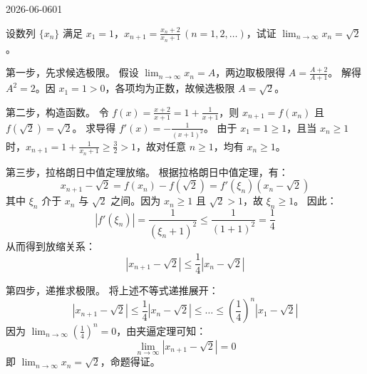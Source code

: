 \begin{mistake}{2026-06-06}{01}

\begin{problemcontent}
设数列 \(\{x_n\}\) 满足 \(x_1 = 1\)，\(x_{n+1} = \frac{x_n + 2}{x_n + 1} \, (n=1,2,\dots)\)，试证 \(\lim_{n \to \infty} x_n = \sqrt{2}\)。
\end{problemcontent}

\begin{solutioncontent}
第一步，先求候选极限。
假设 \(\lim_{n \to \infty} x_n = A\)，两边取极限得 \(A = \frac{A+2}{A+1}\)。
解得 \(A^2 = 2\)。因 \(x_1 = 1 > 0\)，各项均为正数，故候选极限 \(A = \sqrt{2}\)。

第二步，构造函数。
令 \(f(x) = \frac{x+2}{x+1} = 1 + \frac{1}{x+1}\)，则 \(x_{n+1} = f(x_n)\) 且 \(f(\sqrt{2}) = \sqrt{2}\)。
求导得 \(f'(x) = -\frac{1}{(x+1)^2}\)。
由于 \(x_1 = 1 \ge 1\)，且当 \(x_n \ge 1\) 时，\(x_{n+1} = 1 + \frac{1}{x_n+1} \ge \frac{3}{2} > 1\)，故对任意 \(n \ge 1\)，均有 \(x_n \ge 1\)。

第三步，拉格朗日中值定理放缩。
根据拉格朗日中值定理，有：
\[
x_{n+1} - \sqrt{2} = f(x_n) - f(\sqrt{2}) = f'(\xi_n)(x_n - \sqrt{2})
\]
其中 \(\xi_n\) 介于 \(x_n\) 与 \(\sqrt{2}\) 之间。因为 \(x_n \ge 1\) 且 \(\sqrt{2} > 1\)，故 \(\xi_n \ge 1\)。
因此：
\[
|f'(\xi_n)| = \frac{1}{(\xi_n+1)^2} \le \frac{1}{(1+1)^2} = \frac{1}{4}
\]
从而得到放缩关系：
\[
|x_{n+1} - \sqrt{2}| \le \frac{1}{4} |x_n - \sqrt{2}|
\]

第四步，递推求极限。
将上述不等式递推展开：
\[
|x_{n+1} - \sqrt{2}| \le \frac{1}{4} |x_n - \sqrt{2}| \le \dots \le \left(\frac{1}{4}\right)^n |x_1 - \sqrt{2}|
\]
因为 \(\lim_{n \to \infty} \left(\frac{1}{4}\right)^n = 0\)，由夹逼定理可知：
\[
\lim_{n \to \infty} |x_{n+1} - \sqrt{2}| = 0
\]
即 \(\lim_{n \to \infty} x_n = \sqrt{2}\)，命题得证。
\end{solutioncontent}


\end{mistake}
